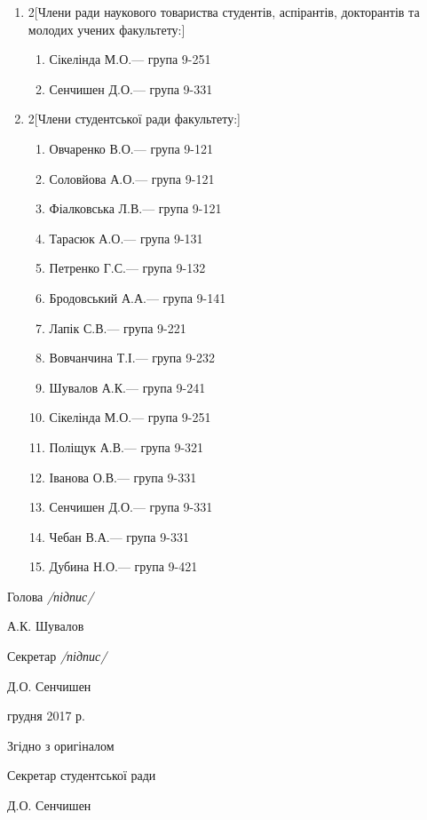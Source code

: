 \documentclass[
	a4paper,
	12pt,
	oneside,
	draft
]{extreport}
\newcommand{\sign}[2]{
	\bigskip\par\noindent
	\begin{minipage}[b]{70mm}#1\end{minipage}	\hfill
	\begin{minipage}[b]{50mm}#2\end{minipage}	\par	}
\newcommand{\signEqualProof}[3]{
	\bigskip\vfill
	\par\noindent #1
	\par\noindent Згідно з оригіналом
	\sign{#2}{#3}\vfill}
\newcommand{\writerTel}[2]{
	\vfill\scriptsize\parindent=-0.5mm
	\par\noindent #1
	\par\noindent #2}
\begin{document}
{\begin{enumerate}[label=\Roman*.]
\item \begin{multicols}{2}[Члени ради наукового товариства студентів, аспірантів, докторантів та молодих учених факультету:]
\begin{enumerate}[topsep=0pt,itemsep=-1ex,partopsep=1ex,parsep=1ex,label=\arabic*.]
\item Сікелінда М.О.\hfill --- група 9-251
\item Сенчишен Д.О.\hfill --- група 9-331
\end{enumerate}
\end{multicols}


\newpage\item \begin{multicols}{2}[Члени студентської ради факультету:]
\begin{enumerate}[topsep=0pt,itemsep=-1ex,partopsep=1ex,parsep=1ex,label=\arabic*.]
\item Овчаренко В.О.\hfill --- група 9-121
\item Соловйова А.О.\hfill --- група 9-121
\item Фіалковська Л.В.\hfill --- група 9-121
\item Тарасюк А.О.\hfill --- група 9-131
\item Петренко Г.С.\hfill --- група 9-132
\item Бродовський А.А.\hfill --- група 9-141
\item Лапік С.В.\hfill --- група 9-221
\item Вовчанчина Т.І.\hfill --- група 9-232
\item Шувалов А.К.\hfill --- група 9-241
\item Сікелінда М.О.\hfill --- група 9-251
\item Поліщук А.В.\hfill --- група 9-321
\item Іванова О.В.\hfill --- група 9-331
\item Сенчишен Д.О.\hfill --- група 9-331
\item Чебан В.А.\hfill --- група 9-331
\item Дубина Н.О.\hfill --- група 9-421
\end{enumerate}
\end{multicols}

\end{enumerate}}



\bfseries 
\sign{Голова {\hfill\normalfont\small\itshape /підпис/} }{А.К. Шувалов}
\sign{Секретар {\hfill\normalfont\small\itshape /підпис/} }{Д.О. Сенчишен}
\normalfont

\signEqualProof{07 грудня 2017 р.}{Секретар студентської ради}{Д.О. Сенчишен}
\vfill
\vfill
\vfill
\vfill
\end{document}

